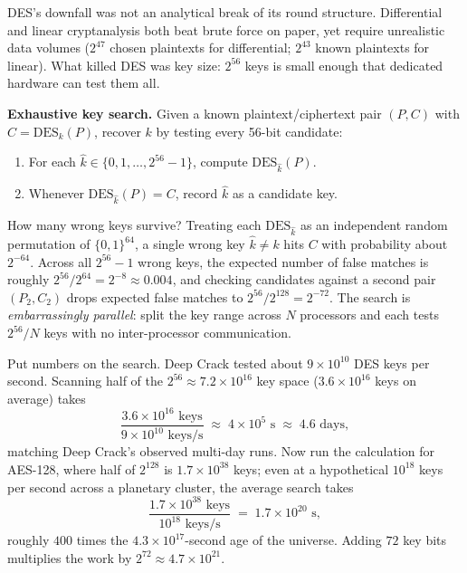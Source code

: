 DES's downfall was not an analytical break of its round structure. Differential and linear cryptanalysis both beat brute force on paper, yet require unrealistic data volumes ($2^{47}$ chosen plaintexts for differential; $2^{43}$ known plaintexts for linear). What killed DES was key size: $2^{56}$ keys is small enough that dedicated hardware can test them all.

\begin{attackbox}
\textbf{Exhaustive key search.} Given a known plaintext/ciphertext pair $(P, C)$ with $C = \mathrm{DES}_k(P)$, recover $k$ by testing every 56-bit candidate:
\begin{enumerate}
  \item For each $\hat k \in \{0, 1, \dots, 2^{56}-1\}$, compute $\mathrm{DES}_{\hat k}(P)$.
  \item Whenever $\mathrm{DES}_{\hat k}(P) = C$, record $\hat k$ as a candidate key.
\end{enumerate}
How many wrong keys survive? Treating each $\mathrm{DES}_{\hat k}$ as an independent random permutation of $\{0,1\}^{64}$, a single wrong key $\hat k \ne k$ hits $C$ with probability about $2^{-64}$. Across all $2^{56} - 1$ wrong keys, the expected number of false matches is roughly $2^{56} / 2^{64} = 2^{-8} \approx 0.004$, and checking candidates against a second pair $(P_2, C_2)$ drops expected false matches to $2^{56} / 2^{128} = 2^{-72}$. The search is \emph{embarrassingly parallel}: split the key range across $N$ processors and each tests $2^{56}/N$ keys with no inter-processor communication.
\end{attackbox}

\begin{walkbox}
Put numbers on the search. Deep Crack tested about $9 \times 10^{10}$ DES keys per second. Scanning half of the $2^{56} \approx 7.2 \times 10^{16}$ key space ($3.6 \times 10^{16}$ keys on average) takes
\[
\frac{3.6 \times 10^{16}\text{ keys}}{9 \times 10^{10}\text{ keys/s}} \;\approx\; 4 \times 10^{5}\text{ s} \;\approx\; 4.6\text{ days},
\]
matching Deep Crack's observed multi-day runs. Now run the calculation for AES-128, where half of $2^{128}$ is $1.7 \times 10^{38}$ keys; even at a hypothetical $10^{18}$ keys per second across a planetary cluster, the average search takes
\[
\frac{1.7 \times 10^{38}\text{ keys}}{10^{18}\text{ keys/s}} \;=\; 1.7 \times 10^{20}\text{ s},
\]
roughly $400$ times the $4.3 \times 10^{17}$-second age of the universe. Adding $72$ key bits multiplies the work by $2^{72} \approx 4.7 \times 10^{21}$.
\end{walkbox}

